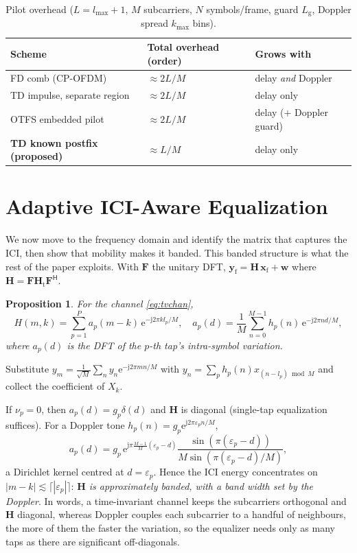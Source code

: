 \documentclass[onecolumn,journal]{IEEEtran}
\theoremstyle{bfhead}
\newtheorem{proposition}{Proposition}
\newcommand{\eu}{\mathrm{e}}
\newcommand{\jj}{\mathrm{j}}
\newcommand{\bx}{\bm{x}}
\newcommand{\by}{\bm{y}}
\newcommand{\bw}{\bm{w}}
\newcommand{\bH}{\bm{H}}
\newcommand{\bF}{\bm{F}}
\begin{document}
\begin{table}[!ht]
\centering
\caption{Pilot overhead ($L=l_{\max}+1$, $M$ subcarriers, $N$ symbols/frame,
guard $L_{\mathrm g}$, Doppler spread $k_{\max}$ bins).}
\label{tab:overhead}
\renewcommand{\arraystretch}{1.3}
\begin{tabular}{@{}l l l@{}}
\toprule
Scheme & Total overhead (order) & Grows with\\
\midrule
FD comb (CP-OFDM)            & $\approx 2L/M$ & delay \emph{and} Doppler\\
TD impulse, separate region  & $\approx 2L/M$ & delay only\\
OTFS embedded pilot          & $\approx 2L/M$ & delay ($+$ Doppler guard)\\
\textbf{TD known postfix (proposed)} & $\approx L/M$ & delay only\\
\bottomrule
\end{tabular}
\end{table}

\section{Adaptive ICI-Aware Equalization}
\label{sec:ici}
We now move to the frequency domain and identify the matrix that captures the
ICI, then show that mobility makes it banded. This banded structure is what the
rest of the paper exploits. With $\bF$ the unitary DFT,
$\by_{\mathrm f}=\bH\,\bx_{\mathrm f}+\bw$ where
$\bH=\bF\bH_{\mathrm t}\bF^{\mathsf H}$.

\begin{proposition}\label{prop:main}
For the channel \eqref{eq:tvchan},
\begin{equation}
H(m,k)=\sum_{p=1}^{P}a_p(m-k)\,\eu^{-\jj2\pi k l_p/M},\quad
a_p(d)=\frac{1}{M}\sum_{n=0}^{M-1} h_p(n)\,\eu^{-\jj2\pi nd/M},
\label{eq:Hmk}
\end{equation}
where $a_p(d)$ is the DFT of the $p$-th tap's intra-symbol variation.
\end{proposition}
\begin{IEEEproof}
Substitute $y_m=\frac{1}{\sqrt M}\sum_n y_n\eu^{-\jj2\pi mn/M}$ with
$y_n=\sum_p h_p(n)x_{(n-l_p)\bmod M}$ and collect the coefficient of $X_k$.
\end{IEEEproof}

If $\nu_p=0$, then $a_p(d)=g_p\delta(d)$ and $\bH$ is diagonal
(single-tap equalization suffices). For a Doppler tone
$h_p(n)=g_p\eu^{\jj2\pi\varepsilon_p n/M}$,
\begin{equation}
a_p(d)=g_p\,\eu^{\jj\pi\frac{M-1}{M}(\varepsilon_p-d)}
\frac{\sin(\pi(\varepsilon_p-d))}{M\sin(\pi(\varepsilon_p-d)/M)},
\label{eq:dirichlet}
\end{equation}
a Dirichlet kernel centred at $d=\varepsilon_p$. Hence the ICI energy
concentrates on $|m-k|\lesssim\lceil|\varepsilon_p|\rceil$: \emph{$\bH$ is
approximately banded, with a band width set by the Doppler}. In words, a
time-invariant channel keeps the subcarriers orthogonal and $\bH$ diagonal,
whereas Doppler couples each subcarrier to a handful of neighbours, the more of
them the faster the variation, so the equalizer needs only as many taps as there
are significant off-diagonals.
\end{document}
